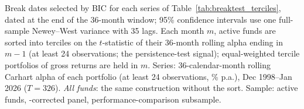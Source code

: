 \begin{table}[!htbp]
\begin{minipage}{\tabletempwidth}
\captionsetup{width=\linewidth}
\caption{Bai--Perron Break Dates by Past-Performance Tercile}\label{tab:breaktest_terciles_dates}
\ifdim\wd\tabletempbox>\linewidth
  \resizebox{\linewidth}{!}{\usebox{\tabletempbox}}
\else
  \usebox{\tabletempbox}
\fi
\par\medskip
\begin{singlespace}\tablefont\noindent
Break dates selected by BIC for each series of Table~\ref{tab:breaktest_terciles}, dated at the end of the 36-month window; 95\% confidence intervals use one full-sample Newey--West variance with 35 lags. Each month $m$, active funds are sorted into terciles on the $t$-statistic of their 36-month rolling \textcite{Carhart1997} alpha ending in $m-1$ (at least 24 observations; the persistence-test signal); equal-weighted tercile portfolios of gross returns are held in $m$. Series: 36-calendar-month rolling Carhart alpha of each portfolio (at least 24 observations, \% p.a.), Dec 1998--Jan 2026 ($T=326$). \textit{All funds}: the same construction without the sort. Sample: active funds, \textcite{Evans2010}-corrected panel, performance-comparison subsample.
\end{singlespace}
\end{minipage}
\end{table}

